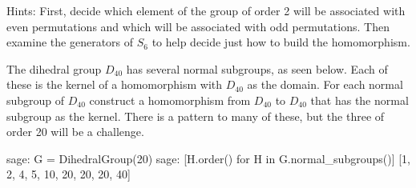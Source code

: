 %
Hints:  First, decide which element of the group of order 2 will be associated with even permutations and which will be associated with odd permutations.  Then examine the generators of $S_6$ to help decide just how to build the homomorphism.
\begin{sageverbatim}\end{sageverbatim}
%
%
The dihedral group $D_{40}$ has several normal subgroups, as seen below.  Each of these is the kernel of a homomorphism with $D_{40}$ as the domain.  For each normal subgroup of $D_{40}$ construct a homomorphism from $D_{40}$ to $D_{40}$ that has the normal subgroup as the kernel.  There is a pattern to many of these, but the three of order 20 will be a challenge.
%
\begin{sageexample}
sage: G = DihedralGroup(20)
sage: [H.order() for H in G.normal_subgroups()]
[1, 2, 4, 5, 10, 20, 20, 20, 40]
\end{sageexample}
%
%
\begin{sageverbatim}\end{sageverbatim}
